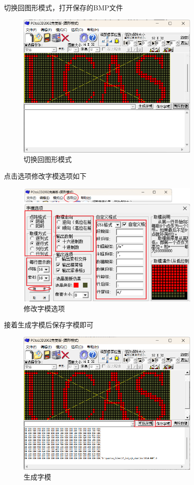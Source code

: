 \documentclass[UTF8]{article}
\theoremstyle{MyLineTheoremStyle} %
\theoremstyle{MyBlockTheoremStyle} %
\theoremstyle{MySubsubsectionStyle} %
\begin{document}
切换回图形模式，打开保存的BMP文件

\begin{figure}[H]
    \centering
    \includegraphics[width=0.8\textwidth]{tuxing.png}
    \caption{切换回图形模式}
    \label{fig:切换回图形模式}
\end{figure}

点击选项修改字模选项如下
\begin{figure}[H]
    \centering
    \includegraphics[width=0.8\textwidth]{zimoxiugai.png}
    \caption{修改字模选项}
    \label{fig:修改字模选项}
\end{figure}

接着生成字模后保存字模即可
\begin{figure}[H]
    \centering
    \includegraphics[width=0.8\textwidth]{zimogener.png}
    \caption{生成字模}
    \label{fig:生成字模}
\end{figure}
\end{document}
